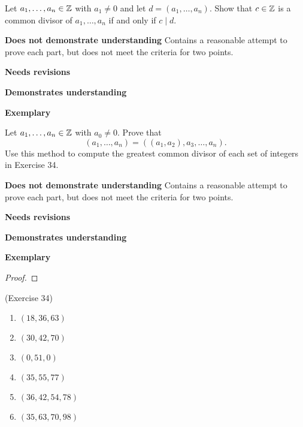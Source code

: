 \documentclass[letterpaper, 11pt]{../ximera}
\begin{document}
\begin{ex}
     Let $a_1,\dots,a_n\in\mathbb Z$ with $a_1\neq 0$ and let $d=(a_1,\dots,a_n).$ Show that $c\in\mathbb Z$ is a common divisor of $a_1,\dots,a_n$ if and only if $c\mid d.$ 
\end{ex}

\begin{writeRubric}
    \item \textbf{Does not demonstrate understanding}
     Contains a reasonable attempt to prove each part, but does not meet the criteria for two points.
    \item \textbf{Needs revisions}
     
    \item \textbf{Demonstrates understanding}
    
    \item \textbf{Exemplary}
        
\end{writeRubric}
                                       
\begin{ex}
 Let $a_1,\dots,a_n\in\mathbb Z$ with $a_0\neq 0$.  Prove that 
	\[(a_1,\dots,a_n)=((a_1,a_2),a_3,\dots,a_n).\]
Use this method to compute the greatest common divisor of each set of integers in Exercise 34.
\end{ex}

\begin{writeRubric}
    \item \textbf{Does not demonstrate understanding}
     Contains a reasonable attempt to prove each part, but does not meet the criteria for two points.
    \item \textbf{Needs revisions}
     
    \item \textbf{Demonstrates understanding}
    
    \item \textbf{Exemplary}
        
\end{writeRubric}
                                       \begin{proof}
 
\end{proof}
\begin{solution}(Exercise 34)
 
\begin{enumerate}%
	\item $(18,36,63)$
	
	\item $(30,42,70)$
	
	\item $(0,51,0)$
	
	\item $(35, 55, 77)$
	
	\item $(36, 42, 54, 78)$
	
	\item $(35, 63, 70, 98)$
\end{enumerate}
\end{solution}
\end{document}
